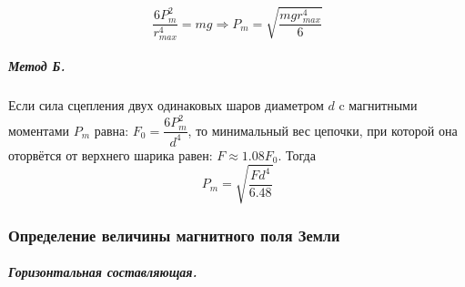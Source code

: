 \documentclass[12pt,a4paper]{article}
\begin{document}
\begin{equation}
    \frac{6P_m^2}{r_{max}^4}=mg \Rightarrow P_m = \sqrt{\frac{mgr_{max}^4}{6}}
\end{equation}

\subparagraph*{Метод Б.}
Если сила сцепления двух одинаковых шаров диаметром $d$ c магнитными моментами $P_m$ равна: $F_0 = \dfrac{6P_m^2}{d^4}$,
то минимальный вес цепочки, при которой она оторвётся от верхнего шарика равен: $F \approx 1.08 F_0$. Тогда\\

\begin{equation}
    P_m = \sqrt{\dfrac{Fd^4}{6.48}}
\end{equation}

\subsubsection*{Определение величины магнитного поля Земли}

\subparagraph*{Горизонтальная составляющая.}
\end{document}
